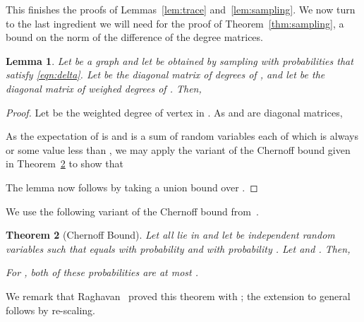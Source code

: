 \documentclass[11pt]{article}
\newtheorem{theorem}{Theorem}[section]
\newtheorem{lemma}[theorem]{Lemma}
\begin{document}
This finishes the proofs of Lemmas~\ref{lem:trace} and~\ref{lem:sampling}.
We now turn to the last ingredient we will need for the proof of Theorem~\ref{thm:sampling},
  a bound on the norm of the difference of the degree matrices.


\begin{lemma}\label{lem:sampledDegrees}
Let  be a graph and let  be obtained by sampling  with probabilities
   that satisfy \eqref{eqn:delta}.
Let  be the diagonal matrix
  of degrees of , and let  be the diagonal matrix of weighed degrees
  of .
Then,

\end{lemma}
\begin{proof}
Let  be the weighted degree of vertex  in .
As  and  are diagonal matrices,

As the expectation of  is  and
   is a sum of  random variables
  each of which is always  or some value less than ,
  we may apply the variant of the Chernoff bound given in
  Theorem~\ref{thm:chernoff}
  to show that

The lemma now follows by taking a union bound over .
\end{proof}



We use the following variant of the Chernoff bound from~\cite{Raghavan}.
\begin{theorem}[Chernoff Bound]\label{thm:chernoff}
Let  all lie in  and 
 let  be independent random variables such
  that  equals  with probability 
  and  with probability .
Let  and
  .
Then,

For ,
  both of these probabilities are at most
  .
\end{theorem}
We remark that Raghavan~\cite{Raghavan} proved this theorem with ;
  the extension to general  follows by re-scaling.
\end{document}
